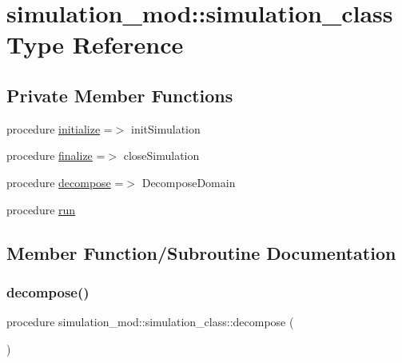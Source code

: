 \hypertarget{structsimulation__mod_1_1simulation__class}{}\section{simulation\+\_\+mod\+:\+:simulation\+\_\+class Type Reference}
\label{structsimulation__mod_1_1simulation__class}
\subsection*{Private Member Functions}
\begin{DoxyCompactItemize}
\item 
procedure \hyperlink{structsimulation__mod_1_1simulation__class_a8bfe8e1f97c7cbdfc2617da0355f65a5}{initialize} =$>$ init\+Simulation
\item 
procedure \hyperlink{structsimulation__mod_1_1simulation__class_a7699b373324ef011e2d514173681eb2a}{finalize} =$>$ close\+Simulation
\item 
procedure \hyperlink{structsimulation__mod_1_1simulation__class_a5c614118dc1ffc74245ef0c5b2cc3a1d}{decompose} =$>$ Decompose\+Domain
\item 
procedure \hyperlink{structsimulation__mod_1_1simulation__class_a47d3f761f38558be6fcfe11f235c7699}{run}
\end{DoxyCompactItemize}


\subsection{Member Function/\+Subroutine Documentation}
\mbox{\label{structsimulation__mod_1_1simulation__class_a5c614118dc1ffc74245ef0c5b2cc3a1d}} 
\subsubsection{\texorpdfstring{decompose()}{decompose()}}
{\footnotesize\ttfamily procedure simulation\+\_\+mod\+::simulation\+\_\+class\+::decompose (\begin{DoxyParamCaption}{ }\end{DoxyParamCaption})\hspace{0.3cm}{\ttfamily [private]}}


